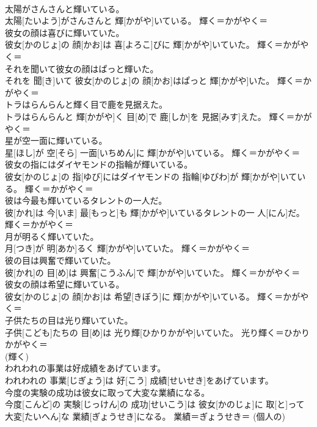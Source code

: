 \documentclass[8pt]{extreport}
\begin{document}
\begin{CJK}{UTF8}{min}
{\\	太陽がさんさんと輝いている。	
\\	太陽[たいよう]がさんさんと 輝[かがや]いている。	輝く＝かがやく＝ 
\\	彼女の顔は喜びに輝いていた。	
\\	彼女[かのじょ]の 顔[かお]は 喜[よろこ]びに 輝[かがや]いていた。	輝く＝かがやく＝ 
\\	それを聞いて彼女の顔はぱっと輝いた。	
\\	それを 聞[き]いて 彼女[かのじょ]の 顔[かお]はぱっと 輝[かがや]いた。	輝く＝かがやく＝ 
\\	トラはらんらんと輝く目で鹿を見据えた。	
\\	トラはらんらんと 輝[かがや]く 目[め]で 鹿[しか]を 見据[みす]えた。	輝く＝かがやく＝ 
\\	星が空一面に輝いている。	
\\	星[ほし]が 空[そら] 一面[いちめん]に 輝[かがや]いている。	輝く＝かがやく＝ 
\\	彼女の指にはダイヤモンドの指輪が輝いている。	
\\	彼女[かのじょ]の 指[ゆび]にはダイヤモンドの 指輪[ゆびわ]が 輝[かがや]いている。	輝く＝かがやく＝ 
\\	彼は今最も輝いているタレントの一人だ。	
\\	彼[かれ]は 今[いま] 最[もっと]も 輝[かがや]いているタレントの一 人[にん]だ。	輝く＝かがやく＝ 
\\	月が明るく輝いていた。	
\\	月[つき]が 明[あか]るく 輝[かがや]いていた。	輝く＝かがやく＝ 
\\	彼の目は興奮で輝いていた。	
\\	彼[かれ]の 目[め]は 興奮[こうふん]で 輝[かがや]いていた。	輝く＝かがやく＝ 
\\	彼女の顔は希望に輝いている。	
\\	彼女[かのじょ]の 顔[かお]は 希望[きぼう]に 輝[かがや]いている。	輝く＝かがやく＝ 
\\	子供たちの目は光り輝いていた。	
\\	子供[こども]たちの 目[め]は 光り輝[ひかりかがや]いていた。	光り輝く＝ひかりかがやく＝ 
\\	(輝く)
\\	われわれの事業は好成績をあげています。	
\\	われわれの 事業[じぎょう]は 好[こう] 成績[せいせき]をあげています。	
\\	今度の実験の成功は彼女に取って大変な業績になる。	
\\	今度[こんど]の 実験[じっけん]の 成功[せいこう]は 彼女[かのじょ]に 取[と]って 大変[たいへん]な 業績[ぎょうせき]になる。	業績＝ぎょうせき＝ (個人の) 
}
\end{CJK}
\end{document}
